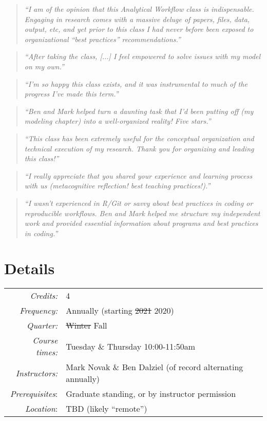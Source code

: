 \documentclass[10pt]{article}
\begin{document}
\begin{quote}
	\emph{``I am of the opinion that this Analytical Workflow class is indispensable. Engaging in research comes with a massive deluge of papers, files, data, output, etc, and yet prior to this class I had never before been exposed to organizational ``best practices'' recommendations.''}
\end{quote}
\begin{quote}
	\emph{``After taking the class, [...] I feel empowered to solve issues with my model on my own.''}
\end{quote}
\begin{quote}
	\emph{``I'm so happy this class exists, and it was instrumental to much of the progress I've made this term.''}
\end{quote}
\begin{quote}
\emph{``Ben and Mark helped turn a daunting task that I'd been putting off (my modeling chapter) into a well-organized reality! Five stars.''}
\end{quote}
\begin{quote}
	\emph{``This class has been extremely useful for the conceptual organization and technical execution of my research. Thank you for organizing and leading this class!''}
\end{quote}
\begin{quote}
	\emph{``I really appreciate that you shared your experience and learning process with us (metacognitive reflection! best teaching practices!).''}
\end{quote}
\begin{quote}
	\emph{``I wasn't experienced in R/Git or savvy about best practices in coding or reproducible workflows. Ben and Mark helped me structure my independent work and provided essential information about programs and best practices in coding.''}
\end{quote}


\section*{Details}
\begin{tabular}{rl}
	\emph{Credits:}	&  4\\ 
	\emph{Frequency:} & Annually (starting \st{2021} 2020)\\
	\emph{Quarter:} & \st{Winter} Fall\\
	\emph{Course times:} &  Tuesday \& Thursday 10:00-11:50am\\
	\emph{Instructors:} & Mark Novak \& Ben Dalziel (of record alternating annually)\\
	\emph{Prerequisites}: & Graduate standing, or by instructor permission\\
	\emph{Location}: & TBD (likely ``remote'')
\end{tabular} 
\end{document}

